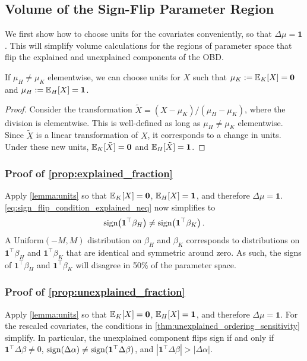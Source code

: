 \subsection{Volume of the Sign-Flip Parameter Region}
We first show how to choose units for the covariates conveniently, so that \( \Delta \mu = \mathbf{1} \).
This will simplify volume calculations for the regions of parameter space that flip the explained and unexplained components of the OBD.
\begin{lemma}
  \label{lemma:units}
  If \( \mu_H \neq \mu_K \) elementwise, we can choose units for \( X \) such that \( \mu_K := \mathbb{E}_K[X] = \mathbf{0} \) and \( \mu_H := \mathbb{E}_H[X] = \mathbf{1} \).
  \begin{proof}  
  Consider the transformation \( \tilde{X} = (X - \mu_K) / (\mu_H - \mu_K) \), where the division is elementwise.
  This is well-defined as long as \( \mu_H \neq \mu_K \) elementwise.
  Since \( \tilde{X} \) is a linear transformation of \( X \), it corresponds to a change in units.
  Under these new units, \( \mathbb{E}_K[\tilde{X}] = \mathbf{0} \) and \( \mathbb{E}_H[\tilde{X}] = \mathbf{1} \).  
  \end{proof}
\end{lemma}

\subsubsection{Proof of \cref{prop:explained_fraction}}
\label{proof:explained_fraction}
Apply \cref{lemma:units} so that \( \mathbb{E}_K[X] = \mathbf{0} \), \( \mathbb{E}_H[X] = \mathbf{1} \), and therefore \( \Delta \mu = \mathbf{1} \).
\cref{eq:sign_flip_condition_explained_neq} now simplifies to 
\[ \operatorname{sign}\!\left(\mathbf{1}^\top \beta_{H}\right) \neq \operatorname{sign}\!\left(\mathbf{1}^\top \beta_{K}\right). \]
A Uniform$(-M, M)$ distribution on \( \beta_H \) and \( \beta_K \) corresponds to distributions on \( \mathbf{1}^\top \beta_{H} \) and \( \mathbf{1}^\top \beta_{K} \) that are identical and symmetric around zero.
As such, the signs of \( \mathbf{1}^\top \beta_{H} \) and \( \mathbf{1}^\top \beta_{K} \) will disagree in 50\% of the parameter space.

\subsubsection{Proof of \cref{prop:unexplained_fraction}}
\label{proof:unexplained_fraction}
Apply \cref{lemma:units} so that \( \mathbb{E}_K[X] = \mathbf{0} \), \( \mathbb{E}_H[X] = \mathbf{1} \), and therefore \( \Delta \mu = \mathbf{1} \).
For the rescaled covariates, the conditions in \cref{thm:unexplained_ordering_sensitivity} simplify.
In particular, the unexplained component flips sign if and only if \( \mathbf{1}^\top \Delta \beta \neq 0 \), \( \operatorname{sign} (\Delta \alpha) \neq \operatorname{sign} (\mathbf{1}^\top \Delta \beta) \), and \( | \mathbf{1}^\top \Delta \beta | > |\Delta \alpha| \).

